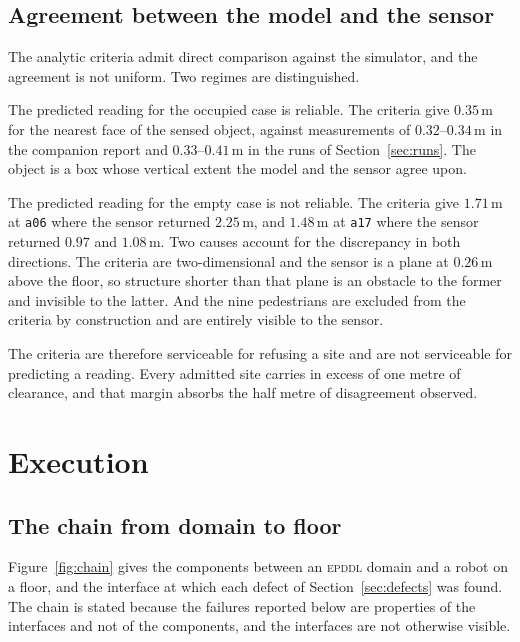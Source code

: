 \documentclass[11pt,a4paper]{article}
\theoremstyle{definition}
\newcommand{\code}[1]{\texttt{\small #1}}
\newcommand{\site}[1]{\code{#1}}
\begin{document}
\subsection{Agreement between the model and the sensor}

The analytic criteria admit direct comparison against the simulator, and the
agreement is not uniform. Two regimes are distinguished.

The predicted reading for the occupied case is reliable. The criteria give
$0.35$\,m for the nearest face of the sensed object, against measurements of
$0.32$--$0.34$\,m in the companion report and $0.33$--$0.41$\,m in the runs of
Section~\ref{sec:runs}. The object is a box whose vertical extent the model and
the sensor agree upon.

The predicted reading for the empty case is not reliable. The criteria give
$1.71$\,m at \site{a06} where the sensor returned $2.25$\,m, and $1.48$\,m at
\site{a17} where the sensor returned $0.97$ and $1.08$\,m. Two causes account
for the discrepancy in both directions. The criteria are two-dimensional and
the sensor is a plane at $0.26$\,m above the floor, so structure shorter than
that plane is an obstacle to the former and invisible to the latter. And the
nine pedestrians are excluded from the criteria by construction and are
entirely visible to the sensor.

The criteria are therefore serviceable for refusing a site and are not
serviceable for predicting a reading. Every admitted site carries in excess of
one metre of clearance, and that margin absorbs the half metre of disagreement
observed.

\section{Execution}
\label{sec:execution}

\subsection{The chain from domain to floor}
\label{sec:chain}

Figure~\ref{fig:chain} gives the components between an \textsc{epddl} domain
and a robot on a floor, and the interface at which each defect of
Section~\ref{sec:defects} was found. The chain is stated because the failures
reported below are properties of the interfaces and not of the components, and
the interfaces are not otherwise visible.
\end{document}
